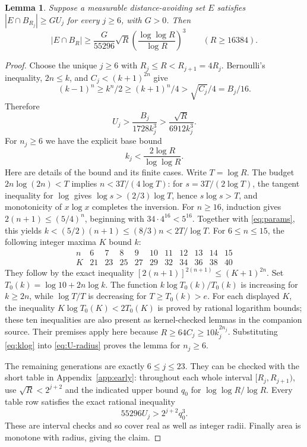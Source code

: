 \documentclass[11pt,a4paper]{article}
\newtheorem{lemma}[theorem]{Lemma}
\theoremstyle{remark}\newtheorem{remark}[theorem]{Remark}
\newcommand{\PhiR}{\sqrt R\left(\frac{\log\log R}{\log R}\right)^3}
\begin{document}
\begin{lemma}\label{lem:extraction}
Suppose a measurable distance-avoiding set $E$ satisfies
$|E\cap B_{R_j}|\ge G U_j$ for every $j\ge6$, with $G>0$. Then
\[
 |E\cap B_R|\ge\frac{G}{55296}\PhiR\qquad(R\ge16384).
\]
\end{lemma}
\begin{proof}
Choose the unique $j\ge6$ with $R_j\le R<R_{j+1}=4R_j$.
Bernoulli's inequality, $2n\le k$, and $C_j<(k+1)^{2n}$ give
\[
 (k-1)^n\ge k^n/2\ge(k+1)^n/4>\sqrt{C_j}/4=B_j/16.
\]
Therefore
\begin{equation}\label{eq:U-radius}
 U_j>\frac{B_j}{1728k_j^3}>\frac{\sqrt R}{6912k_j^3}.
\end{equation}
For $n_j\ge6$ we have the explicit base bound
\begin{equation}\label{eq:klog}
 k_j<\frac{2\log R}{\log\log R}.
\end{equation}
Here are details of the bound and its finite cases. Write $T=\log R$.
The budget $2n\log(2n)<T$ implies $n<3T/(4\log T)$: for
$s=3T/(2\log T)$, the tangent inequality for $\log$ gives
$\log s>(2/3)\log T$, hence $s\log s>T$, and monotonicity of $x\log x$
completes the inversion. For $n\ge16$, induction gives
$2(n+1)\le(5/4)^n$, beginning with $34\cdot4^{16}<5^{16}$.
Together with \eqref{eq:params}, this yields
$k<(5/2)(n+1)\le(8/3)n<2T/\log T$.
For $6\le n\le15$, the following integer maxima $K$ bound $k$:
\[
\begin{array}{c|rrrrrrrrrr}
n&6&7&8&9&10&11&12&13&14&15\\\hline
K&21&23&25&27&29&32&34&36&38&40
\end{array}
\]
They follow by the exact inequality
$[2(n+1)]^{2(n+1)}\le(K+1)^{2n}$.
Set $T_0(k)=\log10+2n\log k$. The function
$k\log T_0(k)/T_0(k)$ is increasing for $k\ge2n$, while
$\log T/T$ is decreasing for $T\ge T_0(k)>e$.
For each displayed $K$, the inequality
$K\log T_0(K)<2T_0(K)$ is proved by rational logarithm bounds;
these ten inequalities are also present as kernel-checked lemmas
in the companion source. Their premises apply here because
$R\ge64C_j\ge10k_j^{2n_j}$.
Substituting \eqref{eq:klog} into \eqref{eq:U-radius} proves the lemma for $n_j\ge6$.

The remaining generations are exactly $6\le j\le23$. They can be checked
with the short table in Appendix~\ref{app:early}: throughout each whole
interval $[R_j,R_{j+1})$, use
$\sqrt R<2^{j+2}$ and the indicated upper bound $q_0$ for
$\log\log R/\log R$. Every table row satisfies the exact rational inequality
\[
 55296 U_j>2^{j+2}q_0^3.
\]
These are interval checks and so cover real as well as integer radii.
Finally area is monotone with radius, giving the claim.
\end{proof}
\end{document}
